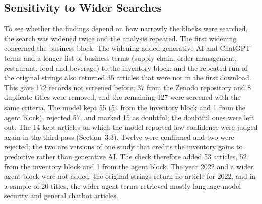 \subsection{Sensitivity to Wider Searches}
To see whether the findings depend on how narrowly the blocks were searched, the search was widened twice and the analysis repeated. The first widening concerned the business block. The widening added generative-AI and ChatGPT terms and a longer list of business terms (supply chain, order management, restaurant, food and beverage) to the inventory block, and the repeated run of the original strings also returned 35 articles that were not in the first download. This gave 172 records not screened before; 37 from the Zenodo repository and 8 duplicate titles were removed, and the remaining 127 were screened with the same criteria. The model kept 55 (54 from the inventory block and 1 from the agent block), rejected 57, and marked 15 as doubtful; the doubtful ones were left out. The 14 kept articles on which the model reported low confidence were judged again in the third pass (Section~3.3). Twelve were confirmed and two were rejected; the two are versions of one study that credits the inventory gains to predictive rather than generative AI. The check therefore added 53 articles, 52 from the inventory block and 1 from the agent block. The year 2022 and a wider agent block were not added: the original strings return no article for 2022, and in a sample of 20 titles, the wider agent terms retrieved mostly language-model security and general chatbot articles.

